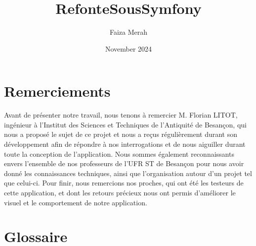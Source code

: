\documentclass[12pt]{article}
\title{RefonteSousSymfony}
\author{Faiza Merah}
\date{November 2024}
\begin{document}
    \section*{Remerciements}
    Avant de présenter notre travail, nous tenons à remercier M. Florian LITOT, ingénieur à l’Institut des Sciences et Techniques de l'Antiquité de Besançon, qui nous a proposé le sujet de ce projet et nous a reçus régulièrement durant son développement afin de répondre à nos interrogations et de nous aiguiller durant toute la conception de l’application.
    \newline
    \newline
    Nous sommes également reconnaissants envers l’ensemble de nos professeurs de l’UFR ST de Besançon pour nous avoir donné les connaissances techniques, ainsi que l’organisation autour d’un projet tel que celui-ci. Pour finir, nous remercions nos proches, qui ont été les testeurs de cette application, et dont les retours précieux nous ont permis d’améliorer le visuel et le comportement de notre application.
    \newpage

    \tableofcontents
    \newpage

    \listoffigures
    \newpage

    \section*{Glossaire}
\end{document}
